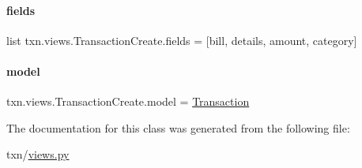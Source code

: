 \paragraph{\texorpdfstring{fields}{fields}}
{\footnotesize\ttfamily list txn.\+views.\+Transaction\+Create.\+fields = \mbox{[}\textquotesingle{}bill\textquotesingle{}, \textquotesingle{}details\textquotesingle{}, \textquotesingle{}amount\textquotesingle{}, \textquotesingle{}category\textquotesingle{}\mbox{]}\hspace{0.3cm}{\ttfamily [static]}}

\mbox{\label{classtxn_1_1views_1_1TransactionCreate_af71d5d75fe4be1c099db6115eb3a3b49}} 
\paragraph{\texorpdfstring{model}{model}}
{\footnotesize\ttfamily txn.\+views.\+Transaction\+Create.\+model = \hyperlink{classtxn_1_1models_1_1Transaction}{Transaction}\hspace{0.3cm}{\ttfamily [static]}}



The documentation for this class was generated from the following file\+:\begin{DoxyCompactItemize}
\item 
txn/\hyperlink{txn_2views_8py}{views.\+py}\end{DoxyCompactItemize}
